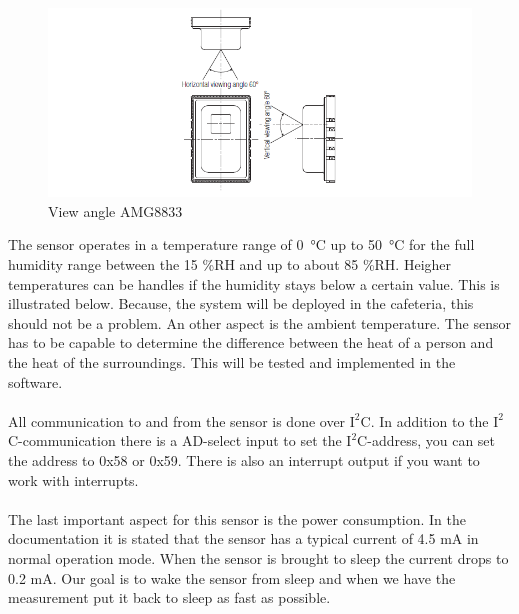 \documentclass[11pt,a4paper]{article}
\begin{document}
\begin{figure}[H]
	\centering
	\includegraphics[width=0.8\linewidth]{view_angle_AMG8833.png}
	\caption{View angle AMG8833}
	\label{fig:angleview}
\end{figure}
The sensor operates in a temperature range of \SI{0}{\celsius} up to \SI{50}{\celsius} for the full humidity range between the 15 \%RH and up to about 85 \%RH. Heigher temperatures can be handles if the humidity stays below a certain value. This is illustrated below. Because, the system will be deployed in the cafeteria, this should not be a problem. An other aspect is the ambient temperature. The sensor has to be capable to determine the difference between the heat of a person and the heat of the surroundings. This will be tested and implemented in the software. 
\\ \\
All communication to and from the sensor is done over $\text{I}^2$C. In addition to the $\text{I}^2$C-communication there is a AD-select input to set the $\text{I}^2$C-address, you can set the address to 0x58 or 0x59. There is also an interrupt output if you want to work with interrupts.
\\ \\
The last important aspect for this sensor is the power consumption. In the documentation it is stated that the sensor has a typical current of 4.5 mA in normal operation mode. When the sensor is brought to sleep the current drops to 0.2 mA. Our goal is to wake the sensor from sleep and when we have the measurement put it back to sleep as fast as possible.
\end{document}
